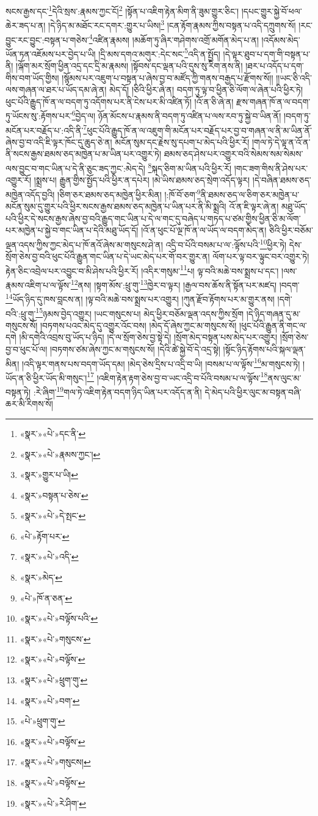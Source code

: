 སངས་རྒྱས་དང་\footnote{«སྣར་»«པེ་»དང་ནི་}དེའི་སྲས་:རྣམས་ཀྱང་ངོ།\footnote{«སྣར་»«པེ་»རྣམས་ཀྱང་།} །སྟོན་པ་འཇིག་རྟེན་མིག་ནི་ཟུམ་གྱུར་ཅིང་། །དཔང་གྱུར་སྐྱེ་བོ་ཕལ་ཆེར་ཟད་པ་ན། །དེ་ཉིད་མ་མཐོང་རང་དགར་:གྱུར་པ་ཡིས།\footnote{«སྣར་»གྱུར་པ་ཡི།} །ངན་རྟོག་རྣམས་ཀྱིས་བསྟན་པ་འདི་དཀྲུགས་སོ། །རང་བྱུང་རང་བྱུང་:བསྟན་པ་གཅེས་\footnote{«སྣར་»བསྟན་པ་ཅེས་}འཛིན་རྣམས། །མཆོག་ཏུ་ཞིར་གཤེགས་འགྲོ་མགོན་མེད་པ་ན། །འདོམས་མེད་ཡོན་ཏན་འཇོམས་པར་བྱེད་པ་ཡི། །དྲི་མས་དགའ་མགུར་:དེང་སང་\footnote{«སྣར་»«པེ་»དེ་སྤང་}འདི་ན་སྤྱོད། །དེ་ལྟར་ཐུབ་པ་དག་གི་བསྟན་པ་ནི། །ལྐོག་མར་སྲོག་ཕྱིན་འདྲ་དང་དྲི་མ་རྣམས། །སྟོབས་དང་ལྡན་པའི་དུས་སུ་རིག་ནས་ནི། །ཐར་པ་འདོད་པ་དག་གིས་བག་ཡོད་གྱིས། །སྙོམས་པར་འཇུག་པ་བསྟན་པ་ཞེས་བྱ་བ་མཛོད་ཀྱི་གནས་བརྒྱད་པ་རྫོགས་སོ།། །།ཡང་ཅི་འདི་ལས་གཞན་ལ་ཐར་པ་ཡོད་དམ་ཞེ་ན། མེད་དོ། །ཅིའི་ཕྱིར་ཞེ་ན། བདག་ཏུ་ལྟ་བ་ཕྱིན་ཅི་ལོག་ལ་ཞེན་པའི་ཕྱིར་ཏེ། ཕུང་པོའི་རྒྱུད་ཁོ་ན་ལ་བདག་ཏུ་འདོགས་པར་ནི་ངེས་པར་མི་འཛིན་ཏོ། །འོ་ན་ཅི་ཞེ་ན། རྫས་གཞན་ཁོ་ན་ལ་བདག་ཏུ་ཡོངས་སུ་:རྟོགས་པར་\footnote{«པེ་»རྟོག་པར་}བྱེད་ལ། ཉོན་མོངས་པ་རྣམས་ནི་བདག་ཏུ་འཛིན་པ་ལས་རབ་ཏུ་སྐྱེ་བ་ཡིན་ནོ། །བདག་ཏུ་མངོན་པར་བརྗོད་པ་:འདི་ནི་\footnote{«སྣར་»«པེ་»འདི་}ཕུང་པོའི་རྒྱུད་ཁོ་ན་ལ་འཇུག་གི་མངོན་པར་བརྗོད་པར་བྱ་བ་གཞན་ལ་ནི་མ་ཡིན་ནོ་ཞེས་བྱ་བ་འདི་ཇི་ལྟར་ཁོང་དུ་ཆུད་ཅེ་ན། མངོན་སུམ་དང་རྗེས་སུ་དཔག་པ་མེད་པའི་ཕྱིར་རོ། །གལ་ཏེ་དེ་ལྟ་ན་འོ་ན་ནི་སངས་རྒྱས་ཐམས་ཅད་མཁྱེན་པ་མ་ཡིན་པར་འགྱུར་ཏེ། ཐམས་ཅད་ཤེས་པར་འགྱུར་བའི་སེམས་སམ་སེམས་ལས་བྱུང་བ་གང་ཡིན་པ་དེ་ནི་ཅུང་ཟད་ཀྱང་:མེད་དེ། \footnote{«སྣར་»མེད་}སྐད་ཅིག་མ་ཡིན་པའི་ཕྱིར་རོ། །གང་ཟག་གིས་ནི་ཤེས་པར་འགྱུར་རོ། །སྨྲས་པ། རྒྱུན་གྱིས་སྤྱོད་པའི་ཕྱིར་ན་དཔེར། །མེ་ཡིས་ཐམས་ཅད་སྲེག་འདོད་ལྟར། །དེ་བཞིན་ཐམས་ཅད་མཁྱེན་འདོད་བྱའི། །ཅིག་ཅར་ཐམས་ཅད་མཁྱེན་ཕྱིར་མིན། །:ཁོ་བོ་ཅག་\footnote{«པེ་»ཁོ་ན་ཅན་}ནི་ཐམས་ཅད་ལ་ཅིག་ཅར་མཁྱེན་པ་མངོན་སུམ་དུ་གྱུར་པའི་ཕྱིར་སངས་རྒྱས་ཐམས་ཅད་མཁྱེན་པ་ཡིན་པར་ནི་མི་སྨྲའི། འོ་ན་ཇི་ལྟར་ཞེ་ན། མཐུ་ཡོད་པའི་ཕྱིར་དེ་སངས་རྒྱས་ཞེས་བྱ་བའི་རྒྱུད་གང་ཡིན་པ་དེ་ལ་གང་དུ་བཞེད་པ་གཏད་པ་ཙམ་གྱིས་ཕྱིན་ཅི་མ་ལོག་པར་མཁྱེན་པ་སྐྱེ་བ་གང་ཡིན་པ་དེའི་མཐུ་ཡོད་དོ། །འོ་ན་ཕུང་པོ་ལྔ་ཁོ་ན་ལ་ཡོད་ལ་བདག་མེད་ན། ཅིའི་ཕྱིར་བཅོམ་ལྡན་འདས་ཀྱིས་ཀྱང་མེད་པ་ཁོ་ནའོ་ཞེས་མ་གསུངས་ཤེ་ན། འདྲི་བ་པོའི་བསམ་པ་ལ་:ལྟོས་པའི་\footnote{«སྣར་»«པེ་»བལྟོས་པའི་}ཕྱིར་ཏེ། དེས་སྲོག་ཅེས་བྱ་བའི་ཕུང་པོའི་རྒྱུན་གང་ཡིན་པ་དེ་ཡང་མེད་པར་གོ་བར་གྱུར་ན། ལོག་པར་ལྟ་བར་ལྟུང་བར་འགྱུར་ཏེ། རྟེན་ཅིང་འབྲེལ་པར་འབྱུང་བ་མི་ཤེས་པའི་ཕྱིར་རོ། །འདིར་གསུམ་\footnote{«སྣར་»«པེ་»གསུངས་}པ། ལྟ་བའི་མཆེ་བས་སྨྲས་པ་དང་། །ལས་རྣམས་འཇིག་པ་ལ་ལྟོས་\footnote{«སྣར་»«པེ་»བལྟོས་}ནས། །སྟག་མོས་:ཕྲུ་གུ་\footnote{«སྣར་»«པེ་»ཕྲུག་གུ་}ཁྱེར་བ་ལྟར། །རྒྱལ་བས་ཆོས་ནི་སྟོན་པར་མཛད། །བདག་\footnote{«སྣར་»«པེ་»བག་}ཡོད་ཉིད་དུ་ཁས་བླངས་ན། །ལྟ་བའི་མཆེ་བས་སྨྲས་པར་འགྱུར། །ཀུན་རྫོབ་རྟོགས་པར་མ་གྱུར་ནས། །དགེ་བའི་:ཕྲུ་གུ་\footnote{«པེ་»ཕྲུག་གུ་}ཉམས་བྱེད་འགྱུར། །ཡང་གསུངས་པ། མེད་ཕྱིར་བཅོམ་ལྡན་འདས་ཀྱིས་སྲོག །དེ་ཉིད་གཞན་དུ་མ་གསུངས་སོ། །བཏགས་པའང་མེད་དུ་འགྱུར་འོང་བས། །མེད་དོ་ཞེས་ཀྱང་མ་གསུངས་སོ། །ཕུང་པོའི་རྒྱུན་ནི་གང་ལ་དགེ །མི་དགེའི་འབྲས་བུ་ཡོད་པ་ཉིད། །དེ་ལ་སྲོག་ཅེས་བྱ་སྟེ་དེ། །སྲོག་མེད་བསྟན་པས་མེད་པར་འགྱུར། །སྲོག་ཅེས་བྱ་བ་ཕུང་པོ་ལ། །བཏགས་ཙམ་ཞེས་ཀྱང་མ་གསུངས་སོ། །དེའི་ཚེ་སྐྱེ་བོ་དེ་འདྲ་སྟེ། །སྟོང་ཉིད་རྟོགས་པའི་སྐལ་ལྡན་མིན། །འདི་ལྟར་གནས་པས་བདག་ཡོད་དམ། །མེད་ཅེས་དྲིས་པ་འདྲི་བ་ཡི། །བསམ་པ་ལ་ལྟོས་\footnote{«སྣར་»«པེ་»བལྟོས་}མ་གསུངས་ཏེ། །ཡོད་ན་ཅི་ཕྱིར་ཡོད་མི་གསུང་།\footnote{«སྣར་»«པེ་»གསུངས།} །འཇིག་རྟེན་རྟག་ཅེས་བྱ་བ་ཡང་འདྲི་བ་པོའི་བསམ་པ་ལ་ལྟོས་\footnote{«སྣར་»«པེ་»བལྟོས་}ནས་ལུང་མ་བསྟན་ཏེ། :རེ་ཞིག་\footnote{«སྣར་»«པེ་»རེ་ཤིག་}གལ་ཏེ་འཇིག་རྟེན་བདག་ཉིད་ཡིན་པར་འདོད་ན་ནི། དེ་མེད་པའི་ཕྱིར་ལུང་མ་བསྟན་བཞི་ཆར་མི་རིགས་སོ། 
